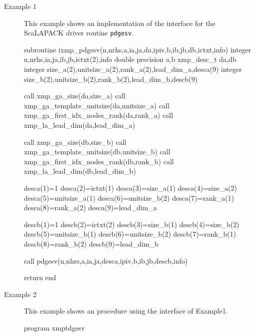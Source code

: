 \begin{description}

 \item[Example 1]
	    This example shows an implementation of the interface for
	    the ScaLAPACK driver routine {\tt pdgesv}.

\begin{XFexample}
      subroutine ixmp_pdgesv(n,nrhs,a,ia,ja,da,ipiv,b,ib,jb,db,ictxt,info)
      integer n,nrhs,ia,ja,ib,jb,ictxt(2),info
      double precision a,b
      xmp_desc_t da,db
      integer size_a(2),unitsize_a(2),rank_a(2),lead_dim_a,desca(9)
      integer size_b(2),unitsize_b(2),rank_b(2),lead_dim_b,descb(9)
      
      call xmp_ga_size(da,size_a)
      call xmp_ga_template_unitsize(da,unitsize_a)
      call xmp_ga_first_idx_nodes_rank(da,rank_a)
      call xmp_la_lead_dim(da,lead_dim_a)
      
      call xmp_ga_size(db,size_b)
      call xmp_ga_template_unitsize(db,unitsize_b)
      call xmp_ga_first_idx_nodes_rank(db,rank_b)
      call xmp_la_lead_dim(db,lead_dim_b)
      
      desca(1)=1
      desca(2)=ictxt(1)
      desca(3)=size_a(1)
      desca(4)=size_a(2)
      desca(5)=unitsize_a(1)
      desca(6)=unitsize_b(2)
      desca(7)=rank_a(1)
      desca(8)=rank_a(2)
      desca(9)=lead_dim_a
      
      descb(1)=1
      descb(2)=ictxt(2)
      descb(3)=size_b(1)
      descb(4)=size_b(2)
      descb(5)=unitsize_b(1)
      descb(6)=unitsize_b(2)
      descb(7)=rank_b(1)
      descb(8)=rank_b(2)
      descb(9)=lead_dim_b
      
      call pdgesv(n,nhrs,a,ia,ja,desca,ipiv,b,ib,jb,descb,info)
      
      return
      end

\end{XFexample}


\item[Example 2]
	   This example shows an {\XMP} procedure using the interface of
	   Example1.

\begin{XFexample}
      program xmptdgesv


\end{XFexample}
\end{description}
